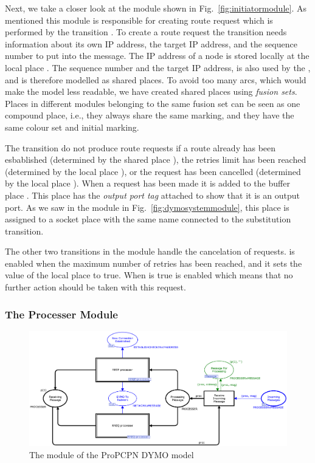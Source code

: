 Next, we take a closer look at the  module shown in Fig.~\ref{fig:initiatormodule}. As mentioned this module is responsible for creating route request which is performed by the transition . To create a route request the transition needs information about its own IP address, the target IP address, and the sequence number to put into the message. The IP address of a node is stored locally at the local place . The sequence number and the target IP address, is also used by the , and is therefore modelled as shared places. To avoid too many arcs, which would make the model less readable, we have created shared places using \emph{fusion sets}. Places in different modules belonging to the same fusion set can be seen as one compound place, i.e., they always share the same marking, and they have the same colour set and initial marking.

The transition  do not produce route requests if a route already has been esbablished (determined by the shared place ), the retries limit has been reached (determined by the local place ), or the request has been cancelled (determined by the local place ). When a request has been made it is added to the buffer place . This place has the \emph{output port tag} attached to show that it is an output port. As we saw in the  module in Fig.~\ref{fig:dymosystemmodule}, this place is assigned to a socket place with the same name connected to the  substitution transition.

The other two transitions in the module handle the cancelation of requests.  is enabled when the maximum number of retries has been reached, and it sets the value of the local place  to true. When  is true  is enabled which means that no further action should be taken with this request.

\subsubsection{The Processer Module}
\begin{figure}
\centering
\includegraphics[width=\textwidth]{dymo/graphics/processermodule.eps}
\caption{The  module of the ProPCPN DYMO model}
\label{fig:processermodule}
\end{figure}

